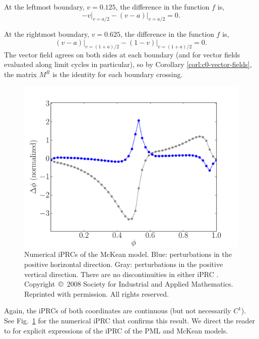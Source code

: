 \documentclass[12pt]{article}
\begin{document}
At the leftmost boundary, $v = 0.125$, the difference in the function $f$ is,
\begin{equation}
\left . -v \right |_{v=a/2} - \left. (v-a) \right |_{v=a/2} = 0.
\end{equation}

At the rightmost boundary, $v = 0.625$, the difference in the function $f$ is,
\begin{equation}
\left . (v-a) \right |_{v=(1+a)/2} - \left. (1-v) \right |_{v=(1+a)/2} = 0.
\end{equation}
The vector field agrees on both sides at each boundary (and for vector fields evaluated along limit cycles in particular), so by Corollary \ref{corl:c0-vector-fields}, the matrix $M^R$ is the identity for each boundary crossing.

\begin{figure}[h!]
\begin{center} \includegraphics[width=1\textwidth]{pmk_prc_fig.pdf}\end{center}
\caption[Numerical iPRCs of the McKean model]{Numerical iPRCs of the McKean model. Blue: perturbations in the positive horizontal direction. Gray: perturbations in the positive vertical direction.  There are no discontinuities in either iPRC \cite{Coombes:2008:SIADS}. Copyright~\copyright ~2008 Society for Industrial and Applied Mathematics.  Reprinted with permission.  All rights reserved.}
\label{fig:pmk_iprc}\end{figure}

Again, the iPRCs of both coordinates are continuous (but not necessarily $C^1$).  See Fig.~\ref{fig:pmk_iprc} for the numerical iPRC that confirms this result.  We direct the reader to \cite{Coombes:2008:SIADS} for explicit expressions of the iPRC of the PML and McKean models.
\end{document}
